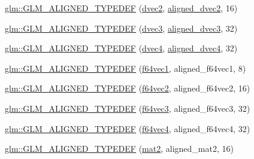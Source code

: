 \begin{DoxyCompactItemize}
\item 
\mbox{\hyperlink{group__gtx__type__aligned_ga78bfec2f185d1d365ea0a9ef1e3d45b8}{glm\+::\+G\+L\+M\+\_\+\+A\+L\+I\+G\+N\+E\+D\+\_\+\+T\+Y\+P\+E\+D\+EF}} (\mbox{\hyperlink{group__core__types_gae6727259898288cae197724d5f172b3b}{dvec2}}, \mbox{\hyperlink{group__gtc__type__aligned_ga1e6972e837bc34b3424af8d63a71d7c6}{aligned\+\_\+dvec2}}, 16)
\item 
\mbox{\hyperlink{group__gtx__type__aligned_ga01fe6fee6db5df580b6724a7e681f069}{glm\+::\+G\+L\+M\+\_\+\+A\+L\+I\+G\+N\+E\+D\+\_\+\+T\+Y\+P\+E\+D\+EF}} (\mbox{\hyperlink{group__core__types_ga7f3287f952e6ccb481231368091702ac}{dvec3}}, \mbox{\hyperlink{group__gtc__type__aligned_ga82da11893fbac3bda647c9de9da62693}{aligned\+\_\+dvec3}}, 32)
\item 
\mbox{\hyperlink{group__gtx__type__aligned_ga687d5b8f551d5af32425c0b2fba15e99}{glm\+::\+G\+L\+M\+\_\+\+A\+L\+I\+G\+N\+E\+D\+\_\+\+T\+Y\+P\+E\+D\+EF}} (\mbox{\hyperlink{group__core__types_ga0824ceed7ec3b2fba89765501c1540b5}{dvec4}}, \mbox{\hyperlink{group__gtc__type__aligned_ga502d8d084a488118c9a5466d73ba1a46}{aligned\+\_\+dvec4}}, 32)
\item 
\mbox{\hyperlink{group__gtx__type__aligned_ga8e842371d46842ff8f1813419ba49d0f}{glm\+::\+G\+L\+M\+\_\+\+A\+L\+I\+G\+N\+E\+D\+\_\+\+T\+Y\+P\+E\+D\+EF}} (\mbox{\hyperlink{group__gtc__type__precision_ga6478d0530433bb907956a46b2cd99161}{f64vec1}}, aligned\+\_\+f64vec1, 8)
\item 
\mbox{\hyperlink{group__gtx__type__aligned_ga32814aa0f19316b43134fc25f2aad2b9}{glm\+::\+G\+L\+M\+\_\+\+A\+L\+I\+G\+N\+E\+D\+\_\+\+T\+Y\+P\+E\+D\+EF}} (\mbox{\hyperlink{group__gtc__type__precision_ga6c794781267fd5c810d9a6e7086e02a6}{f64vec2}}, aligned\+\_\+f64vec2, 16)
\item 
\mbox{\hyperlink{group__gtx__type__aligned_gaf3d3bbc1e93909b689123b085e177a14}{glm\+::\+G\+L\+M\+\_\+\+A\+L\+I\+G\+N\+E\+D\+\_\+\+T\+Y\+P\+E\+D\+EF}} (\mbox{\hyperlink{group__gtc__type__precision_ga659b65d8792f93da76c2da44f06e0b8b}{f64vec3}}, aligned\+\_\+f64vec3, 32)
\item 
\mbox{\hyperlink{group__gtx__type__aligned_ga804c654cead1139bd250f90f9bb01fad}{glm\+::\+G\+L\+M\+\_\+\+A\+L\+I\+G\+N\+E\+D\+\_\+\+T\+Y\+P\+E\+D\+EF}} (\mbox{\hyperlink{group__gtc__type__precision_ga41fb27973aedd37b7284789f2f997420}{f64vec4}}, aligned\+\_\+f64vec4, 32)
\item 
\mbox{\hyperlink{group__gtx__type__aligned_gafed7d010235a3aa7ea2f88646858f2ae}{glm\+::\+G\+L\+M\+\_\+\+A\+L\+I\+G\+N\+E\+D\+\_\+\+T\+Y\+P\+E\+D\+EF}} (\mbox{\hyperlink{group__core__types_ga8357ec0aab6f8cf69313592492663c3f}{mat2}}, aligned\+\_\+mat2, 16)

\end{DoxyCompactItemize}
